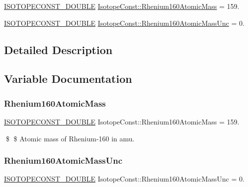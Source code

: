 \begin{DoxyCompactItemize}
\item 
\mbox{\hyperlink{group___isotope_const-_macros_ga8f45a7272ce02c0b4c65c44636ed719a}{I\+S\+O\+T\+O\+P\+E\+C\+O\+N\+S\+T\+\_\+\+D\+O\+U\+B\+LE}} \mbox{\hyperlink{group___isotope_const-_rhenium-_re160_ga0ee16ef53ba6236a2b8a785f829c5360}{Isotope\+Const\+::\+Rhenium160\+Atomic\+Mass}} = 159.
\item 
\mbox{\hyperlink{group___isotope_const-_macros_ga8f45a7272ce02c0b4c65c44636ed719a}{I\+S\+O\+T\+O\+P\+E\+C\+O\+N\+S\+T\+\_\+\+D\+O\+U\+B\+LE}} \mbox{\hyperlink{group___isotope_const-_rhenium-_re160_ga00edbd13f9f50a86ada9cf132b86aeb0}{Isotope\+Const\+::\+Rhenium160\+Atomic\+Mass\+Unc}} = 0.
\end{DoxyCompactItemize}


\subsection{Detailed Description}


\subsection{Variable Documentation}
\mbox{\label{group___isotope_const-_rhenium-_re160_ga0ee16ef53ba6236a2b8a785f829c5360}} 
\subsubsection{\texorpdfstring{Rhenium160\+Atomic\+Mass}{Rhenium160AtomicMass}}
{\footnotesize\ttfamily \mbox{\hyperlink{group___isotope_const-_macros_ga8f45a7272ce02c0b4c65c44636ed719a}{I\+S\+O\+T\+O\+P\+E\+C\+O\+N\+S\+T\+\_\+\+D\+O\+U\+B\+LE}} Isotope\+Const\+::\+Rhenium160\+Atomic\+Mass = 159.}

\$ \$ Atomic mass of Rhenium-\/160 in amu. \mbox{\label{group___isotope_const-_rhenium-_re160_ga00edbd13f9f50a86ada9cf132b86aeb0}} 
\subsubsection{\texorpdfstring{Rhenium160\+Atomic\+Mass\+Unc}{Rhenium160AtomicMassUnc}}
{\footnotesize\ttfamily \mbox{\hyperlink{group___isotope_const-_macros_ga8f45a7272ce02c0b4c65c44636ed719a}{I\+S\+O\+T\+O\+P\+E\+C\+O\+N\+S\+T\+\_\+\+D\+O\+U\+B\+LE}} Isotope\+Const\+::\+Rhenium160\+Atomic\+Mass\+Unc = 0.}

